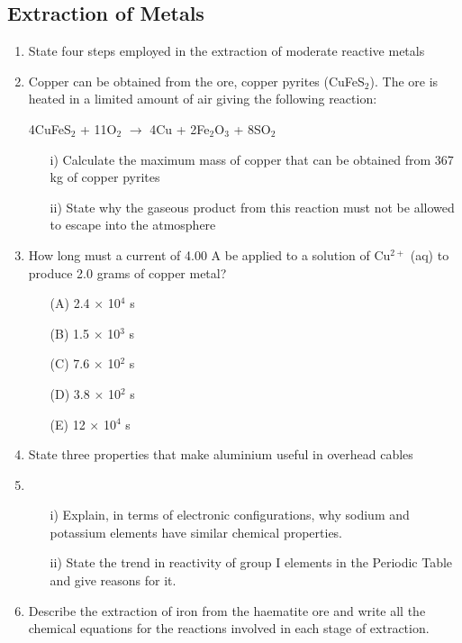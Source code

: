 \subsection{Extraction of Metals}

\begin{enumerate}
	\item State four steps employed in the extraction of moderate reactive metals
	
	\item Copper can be obtained from the ore, copper pyrites (CuFeS$_2$). The ore is heated in a limited amount of air giving the following reaction:
	\begin{center}
		4CuFeS$_2$ + 11O$_2$ $\rightarrow$ 4Cu + 2Fe$_2$O$_3$ + 8SO$_2$
	\end{center}
	\begin{enumerate}[topsep=0ex,itemsep=0ex,partopsep=1ex,parsep=1ex]
		\item[i)] Calculate the maximum mass of copper that can be obtained from 367 kg of copper pyrites
		\item[ii)] State why the gaseous product from this reaction must not be allowed to escape into the atmosphere
	\end{enumerate}
	
	\item How long must a current of 4.00 A be applied to a solution of Cu$^{2+}$ (aq) to produce 2.0 grams of copper metal?
	\begin{enumerate}[topsep=0ex,itemsep=0ex,partopsep=1ex,parsep=1ex]
		\item[(A)] 2.4 $\times$ 10$^4$ s
		\item[(B)] 1.5 $\times$ 10$^3$ s
		\item[(C)] 7.6 $\times$ 10$^2$ s
		\item[(D)] 3.8 $\times$ 10$^2$ s
		\item[(E)] 12 $\times$ 10$^4$ s
	\end{enumerate}
	
	\item State three properties that make aluminium useful in overhead cables
	
	\item 
	\begin{enumerate}[topsep=0ex,itemsep=0ex,partopsep=1ex,parsep=1ex]
		\item[i)] Explain, in terms of electronic configurations, why sodium and potassium elements have similar chemical properties.
		\item[ii)] State the trend in reactivity of group I elements in the Periodic Table and give reasons for it.
	\end{enumerate}
	
	\item Describe the extraction of iron from the haematite ore and write all the chemical equations for the reactions involved in each stage of extraction.

\end{enumerate}









